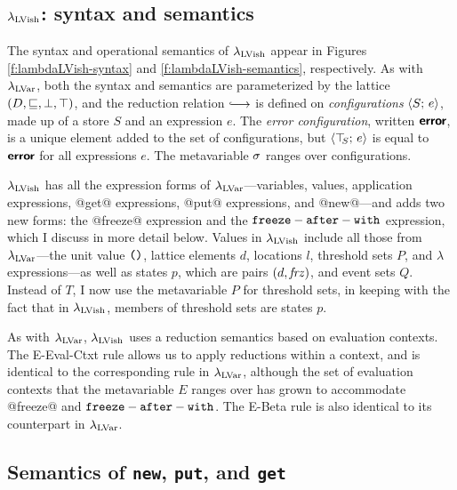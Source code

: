 \subsection{$\lambda_{\textrm{LVish}}$: syntax and semantics}


\FigLambdaLVishGrammar

\FigLambdaLVishSemantics

The syntax and operational semantics of $\lambda_{\textrm{LVish}}$ appear in
Figures \ref{f:lambdaLVish-syntax} and \ref{f:lambdaLVish-semantics},
respectively.  As with $\lambda_{\textrm{LVar}}$, both the syntax and semantics
are parameterized by the lattice $(D, \sqsubseteq, \bot, \top)$, and the
reduction relation $\parstepsto$ is defined on \emph{configurations}
$\langle S;\, e \rangle$, made up of a store $S$ and an expression $e$.  The
\emph{error configuration}, written $\textbf{\textsf{error}}$, is a unique element
added to the set of configurations, but $\langle \top\hspace{-0.85mm}_{S};\, e \rangle$ is equal
to $\textbf{\textsf{error}}$ for all expressions $e$.  The metavariable $\sigma$ ranges
over configurations.

$\lambda_{\textrm{LVish}}$ has all the expression forms of
$\lambda_{\textrm{LVar}}$---variables, values, application expressions, @get@
expressions, @put@ expressions, and @new@---and adds two new forms:
the @freeze@ expression and the ${\mbox{\texttt{freeze}}-\mbox{\texttt{after}}-\mbox{\texttt{with}}}$ expression, which I discuss in
more detail below.  Values in $\lambda_{\textrm{LVish}}$ include all those from
$\lambda_{\textrm{LVar}}$---the unit value $\mbox{\texttt{()}}$, lattice elements $d$,
locations $l$, threshold sets $P$, and $\lambda$ expressions---as well
as states $p$, which are pairs $(d, \mathit{frz})$, and event sets
$Q$.  Instead of $T$, I now use the metavariable $P$ for threshold
sets, in keeping with the fact that in $\lambda_{\textrm{LVish}}$, members of
threshold sets are states $p$.
 
As with $\lambda_{\textrm{LVar}}$, $\lambda_{\textrm{LVish}}$ uses a reduction semantics based
on evaluation contexts.  The {\sc E-Eval-Ctxt} rule allows us to apply
reductions within a context, and is identical to the corresponding
rule in $\lambda_{\textrm{LVar}}$, although the set of evaluation contexts that
the metavariable $E$ ranges over has grown to accommodate @freeze@ and
${\mbox{\texttt{freeze}}-\mbox{\texttt{after}}-\mbox{\texttt{with}}}$.  The {\sc E-Beta} rule is also identical to its counterpart in
$\lambda_{\textrm{LVar}}$.

\subsection{Semantics of \lstinline|new|, \lstinline|put|, and \lstinline|get|}\label{subsection:quasi-semantics-of-new-put-and-get}

